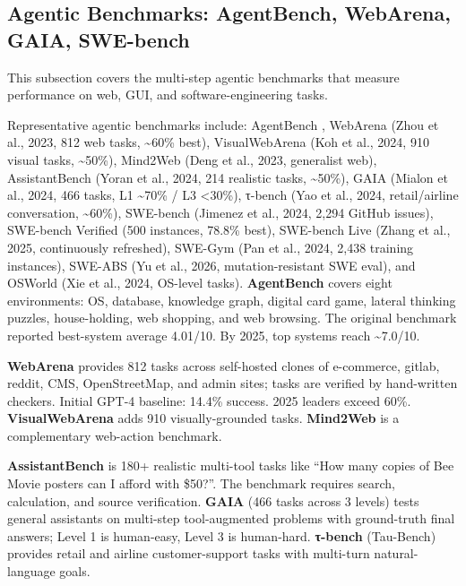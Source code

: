 \documentclass{article}
\begin{document}
\subsection{Agentic Benchmarks: AgentBench, WebArena, GAIA, SWE-bench}\label{agentic-benchmarks-agentbench-webarena-gaia-swe-bench}

This subsection covers the multi-step agentic benchmarks that measure performance on web, GUI, and software-engineering tasks.

Representative agentic benchmarks include: AgentBench \citep{liu20252025}, WebArena (Zhou et al., 2023, 812 web tasks, \textasciitilde60\% best), VisualWebArena (Koh et al., 2024, 910 visual tasks, \textasciitilde50\%), Mind2Web (Deng et al., 2023, generalist web), AssistantBench (Yoran et al., 2024, 214 realistic tasks, \textasciitilde50\%), GAIA (Mialon et al., 2024, 466 tasks, L1 \textasciitilde70\% / L3 \textless30\%), τ-bench (Yao et al., 2024, retail/airline conversation, \textasciitilde60\%), SWE-bench (Jimenez et al., 2024, 2,294 GitHub issues), SWE-bench Verified (500 instances, 78.8\% best), SWE-bench Live (Zhang et al., 2025, continuously refreshed), SWE-Gym (Pan et al., 2024, 2,438 training instances), SWE-ABS (Yu et al., 2026, mutation-resistant SWE eval), and OSWorld (Xie et al., 2024, OS-level tasks). \textbf{AgentBench} \citep{liu20232023} covers eight environments: OS, database, knowledge graph, digital card game, lateral thinking puzzles, house-holding, web shopping, and web browsing. The original benchmark reported best-system average 4.01/10. By 2025, top systems reach \textasciitilde7.0/10.

\textbf{WebArena} \citep{zhou20232023} provides 812 tasks across self-hosted clones of e-commerce, gitlab, reddit, CMS, OpenStreetMap, and admin sites; tasks are verified by hand-written checkers. Initial GPT-4 baseline: 14.4\% success. 2025 leaders exceed 60\%. \textbf{VisualWebArena} adds 910 visually-grounded tasks. \textbf{Mind2Web} is a complementary web-action benchmark.

\textbf{AssistantBench} \citep{yoran20242024} is 180+ realistic multi-tool tasks like ``How many copies of Bee Movie posters can I afford with \$50?''. The benchmark requires search, calculation, and source verification. \textbf{GAIA} (466 tasks across 3 levels) tests general assistants on multi-step tool-augmented problems with ground-truth final answers; Level 1 is human-easy, Level 3 is human-hard. \textbf{τ-bench} (Tau-Bench) provides retail and airline customer-support tasks with multi-turn natural-language goals.
\end{document}
